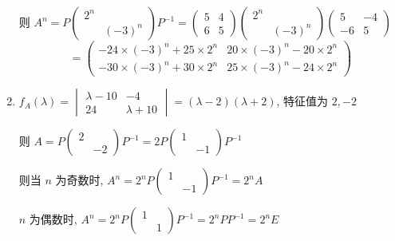 \begin{enumerate}
                   则 \( A^{n} = P\begin{pmatrix}
                       2^{n} &          \\
                             & (-3)^{n}
                   \end{pmatrix}P^{-1} = \begin{pmatrix}
                       5 & 4 \\
                       6 & 5
                   \end{pmatrix}\begin{pmatrix}
                       2^{n} &          \\
                             & (-3)^{n}
                   \end{pmatrix}\begin{pmatrix}
                       5  & -4 \\
                       -6 & 5
                   \end{pmatrix} \)
                   \[ = \begin{pmatrix}
                           -24\times(-3)^{n} + 25\times2^{n} & 20\times(-3)^{n} - 20\times2^{n} \\
                           -30\times(-3)^{n} + 30\times2^{n} & 25\times(-3)^{n} - 24\times2^{n}
                       \end{pmatrix} \]
             \item %
                   \( f_{A}(\lambda) = \begin{vmatrix}
                       \lambda - 10 & -4           \\
                       24           & \lambda + 10
                   \end{vmatrix} = (\lambda - 2)(\lambda + 2) \), 特征值为 \( 2, -2 \)

                   则 \( A = P\begin{pmatrix}
                       2 &    \\
                         & -2
                   \end{pmatrix}P^{-1} = 2P\begin{pmatrix}
                       1 &    \\
                         & -1
                   \end{pmatrix}P^{-1} \)

                   则当 \( n \) 为奇数时, \( A^{n} = 2^{n}P\begin{pmatrix}
                       1 &    \\
                         & -1
                   \end{pmatrix}P^{-1} = 2^{n}A \)

                   \( n \) 为偶数时, \( A^{n} = 2^{n}P\begin{pmatrix}
                       1 &   \\
                         & 1
                   \end{pmatrix}P^{-1} = 2^{n}PP^{-1} = 2^{n}E \)
         \end{enumerate}


